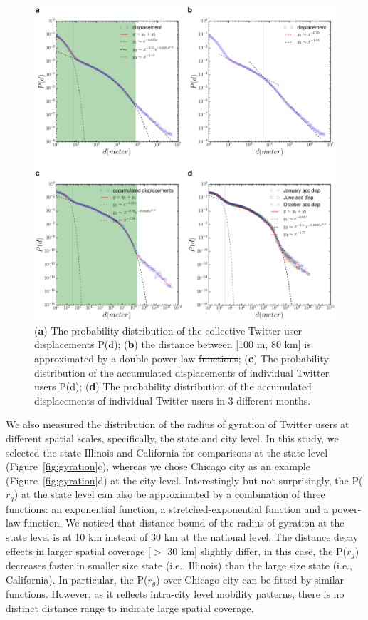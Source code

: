 \documentclass[ijgi,article,accept,moreauthors,pdftex,10pt,a4paper]{mdpi}
\theoremstyle{mdpi}
\newcounter{ex}
\newcounter{re}
\theoremstyle{mdpidefinition}
\providecommand{\DIFadd}[1]{{\protect\color{blue}\uwave{#1}}} %
\providecommand{\DIFdel}[1]{{\protect\color{red}\sout{#1}}}                      %
\providecommand{\DIFaddFL}[1]{\DIFadd{#1}} %
\providecommand{\DIFdelFL}[1]{\DIFdel{#1}} %
\providecommand{\DIFaddbeginFL}{} %
\providecommand{\DIFaddendFL}{} %
\providecommand{\DIFdelbeginFL}{} %
\providecommand{\DIFdelendFL}{} %
\begin{document}
\begin{figure}[ht]
\centering
\includegraphics[width=1.0\linewidth]{./figures/displacement}
\caption{({\bf a}) The probability distribution of the collective Twitter user displacements P(d); ({\bf b}) the distance between [100 m, 80 km] is approximated by a double power-law \DIFdelbeginFL \DIFdelFL{functions}\DIFdelendFL \DIFaddbeginFL \DIFaddFL{function}\DIFaddendFL ; ({\bf c}) The probability distribution of the accumulated displacements of individual Twitter users P(d); ({\bf d}) The probability distribution of the accumulated displacements of individual Twitter users in 3 different months.}

\label{fig:displacement}
\end{figure}
\FloatBarrier

We also measured the distribution of the radius of gyration of Twitter users at different spatial scales, specifically, the state and city level.
In this study, we selected the state Illinois and California for comparisons at the state level (Figure~\ref{fig:gyration}c), whereas we chose Chicago city as an example (Figure~\ref{fig:gyration}d) at the city level.
Interestingly but not surprisingly, the P($r_{g}$) at the state level can also be approximated by a combination of three functions: an exponential function, a stretched-exponential function and a power-law function.
We noticed that distance bound of the radius of gyration at the state level is at 10 km instead of 30 km at the national level.
The distance decay effects in larger spatial coverage [$>$ 30 km] slightly differ, in this case, the P($r_{g}$) decreases faster in smaller size state (i.e., Illinois) than the large size state (i.e., California).
In particular, the P($r_{g}$) over Chicago city can be fitted by similar functions.
However, as it reflects intra-city level mobility patterns, there is no distinct distance range to indicate large spatial coverage.
\end{document}
